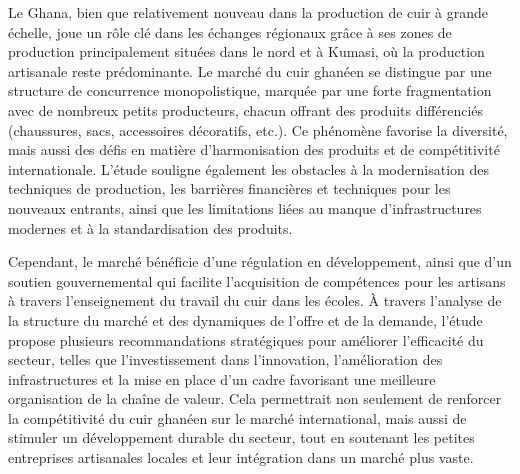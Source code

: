 

\vspace{.5cm}
	 Le Ghana, bien que relativement nouveau dans la production de cuir à grande échelle, joue un rôle clé dans les échanges régionaux grâce à ses zones de production principalement situées dans le nord et à Kumasi, où la production artisanale reste prédominante. Le marché du cuir ghanéen se distingue par une structure de concurrence monopolistique, marquée par une forte fragmentation avec de nombreux petits producteurs, chacun offrant des produits différenciés (chaussures, sacs, accessoires décoratifs, etc.). Ce phénomène favorise la diversité, mais aussi des défis en matière d’harmonisation des produits et de compétitivité internationale. L’étude souligne également les obstacles à la modernisation des techniques de production, les barrières financières et techniques pour les nouveaux entrants, ainsi que les limitations liées au manque d’infrastructures modernes et à la standardisation des produits. 
	 
	 Cependant, le marché bénéficie d’une régulation en développement, ainsi que d’un soutien gouvernemental qui facilite l’acquisition de compétences pour les artisans à travers l’enseignement du travail du cuir dans les écoles. À travers l’analyse de la structure du marché et des dynamiques de l’offre et de la demande, l’étude propose plusieurs recommandations stratégiques pour améliorer l'efficacité du secteur, telles que l'investissement dans l'innovation, l'amélioration des infrastructures et la mise en place d’un cadre favorisant une meilleure organisation de la chaîne de valeur. Cela permettrait non seulement de renforcer la compétitivité du cuir ghanéen sur le marché international, mais aussi de stimuler un développement durable du secteur, tout en soutenant les petites entreprises artisanales locales et leur intégration dans un marché plus vaste.